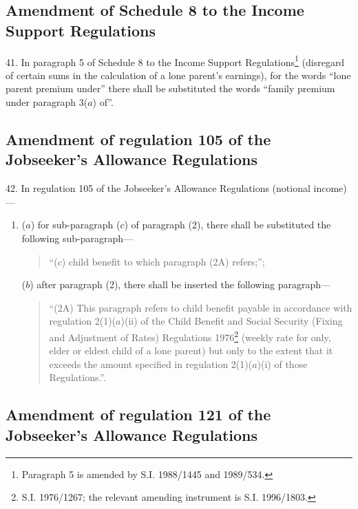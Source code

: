 \documentclass[a4paper]{article}
\begin{document}
\subsection[41. Amendment of Schedule 8 to the Income Support Regulations]{Amendment of Schedule 8 to the Income Support Regulations}

41.  In paragraph 5 of Schedule 8 to the Income Support Regulations\footnote{\frenchspacing Paragraph 5 is amended by S.I. 1988/1445 and 1989/534.} (disregard of certain sums in the calculation of a lone parent’s earnings), for the words “lone parent premium under” there shall be substituted the words “family premium under paragraph 3($a$) of”.

\subsection[42. Amendment of regulation 105 of the Jobseeker’s Allowance Regulations]{Amendment of regulation 105 of the Jobseeker’s Allowance Regulations}

42.  In regulation 105 of the Jobseeker’s Allowance Regulations (notional income)—
\begin{enumerate}\item[]
($a$) for sub-paragraph ($c$) of paragraph (2), there shall be substituted the following sub-paragraph—
\begin{quotation}
“($c$) child benefit to which paragraph (2A) refers;”;
\end{quotation}

($b$) after paragraph (2), there shall be inserted the following paragraph—
\begin{quotation}
“(2A) This paragraph refers to child benefit payable in accordance with regulation 2(1)($a$)(ii) of the Child Benefit and Social Security (Fixing and Adjustment of Rates) Regulations 1976\footnote{\frenchspacing S.I. 1976/1267; the relevant amending instrument is S.I. 1996/1803.} (weekly rate for only, elder or eldest child of a lone parent) but only to the extent that it exceeds the amount specified in regulation 2(1)($a$)(i) of those Regulations.”.
\end{quotation}
\end{enumerate}

\subsection[43. Amendment of regulation 121 of the Jobseeker’s Allowance Regulations]{Amendment of regulation 121 of the Jobseeker’s Allowance Regulations}
\end{document}
